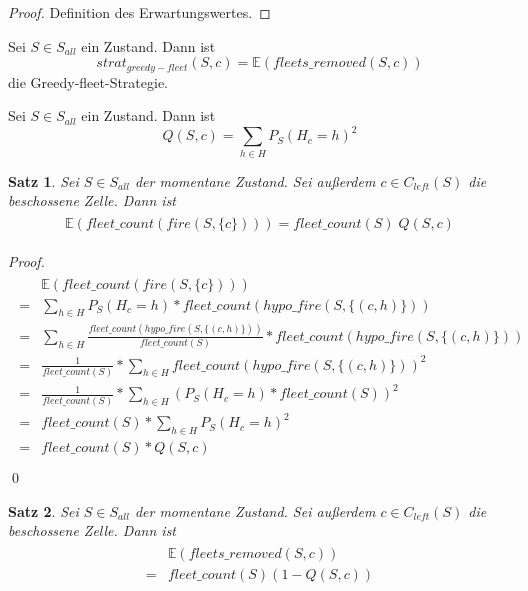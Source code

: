 \documentclass[a4paper,12pt]{llncs}
\numberwithin{equation}{section}
\newtheorem{satz}{Satz}
\begin{document}
\begin{proof}
Definition des Erwartungswertes.
\end{proof}

\begin{definition}
Sei $S\in S_{all}$ ein Zustand.
Dann ist
\[
strat_{greedy-fleet}(S,c)=\mathds{E}(fleets\_removed(S,c))
\]
die Greedy-fleet-Strategie.
\end{definition}


\begin{definition}
Sei $S\in S_{all}$ ein Zustand.
Dann ist
\[
Q(S,c)=\sum_{h \in H} P_S(H_{c}=h)^2
\]
\end{definition}

\begin{satz}
Sei $S\in S_{all}$ der momentane Zustand.
Sei außerdem $c \in C_{left}(S)$ die beschossene Zelle.
Dann ist
\begin{align}
\begin{split}
\mathds{E}(fleet\_count(fire(S,\{c\})))=fleet\_count(S)\; Q(S,c)
\end{split}
\end{align}
\end{satz}

\begin{proof}
\begin{align}
\begin{split}
&\mathds{E}(fleet\_count(fire(S,\{c\})))\\
=&\sum_{h \in H} P_S(H_{c} = h) * fleet\_count(hypo\_fire(S,\{(c,h)\}))\\
=&\sum_{h \in H} \frac{fleet\_count(hypo\_fire(S,\{(c,h)\}))}{fleet\_count(S)}* fleet\_count(hypo\_fire(S,\{(c,h)\}))\\
=&\frac{1}{fleet\_count(S)} * \sum_{h \in H} fleet\_count(hypo\_fire(S,\{(c,h)\}))^2\\
=&\frac{1}{fleet\_count(S)} * \sum_{h \in H} (P_S(H_{c} = h) * fleet\_count(S))^2\\
=&fleet\_count(S) * \sum_{h \in H} P_S(H_{c} = h)^2\\
=&fleet\_count(S) * Q(S,c)\\
\end{split}
\end{align}
\qed
\end{proof}

\begin{satz}
Sei $S\in S_{all}$ der momentane Zustand.
Sei außerdem $c \in C_{left}(S)$ die beschossene Zelle.
Dann ist
\begin{align}
\begin{split}
&\mathds{E}(fleets\_removed(S,c))\\
=&fleet\_count(S) (1 - Q(S,c))
\end{split}
\end{align}
\end{satz}
\end{document}
